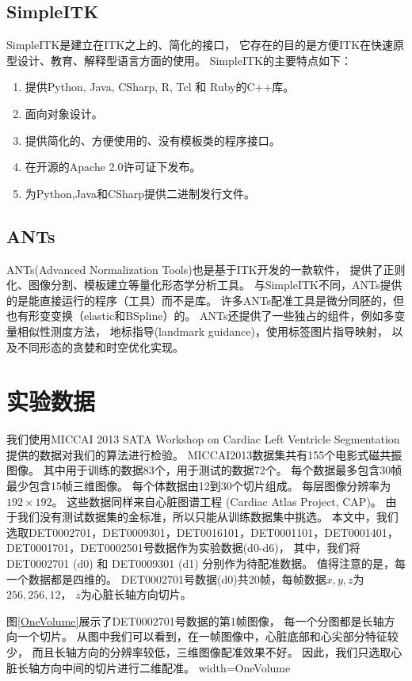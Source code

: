 \subsection{SimpleITK}
SimpleITK是建立在ITK之上的、简化的接口，
它存在的目的是方便ITK在快速原型设计、教育、解释型语言方面的使用。
SimpleITK的主要特点如下：
\begin{enumerate}
\item 提供Python, Java, CSharp, R, Tcl 和 Ruby的C++库。
\item 面向对象设计。
\item 提供简化的、方便使用的、没有模板类的程序接口。
\item 在开源的Apache 2.0许可证下发布。
\item 为Python,Java和CSharp提供二进制发行文件。
\end{enumerate}

\subsection{ANTs}
ANTs(Advanced Normalization Tools)也是基于ITK开发的一款软件，
提供了正则化、图像分割、模板建立等量化形态学分析工具。
与SimpleITK不同，ANTs提供的是能直接运行的程序（工具）而不是库。
许多ANTs配准工具是微分同胚的，但也有形变变换（elastic和BSpline）的。
ANTs还提供了一些独占的组件，例如多变量相似性测度方法，
地标指导(landmark guidance)，使用标签图片指导映射，
以及不同形态的贪婪和时空优化实现。

\section{实验数据}

我们使用MICCAI 2013 SATA Workshop on  Cardiac Left Ventricle Segmentation
提供的数据对我们的算法进行检验。
MICCAI2013数据集共有155个电影式磁共振图像。
其中用于训练的数据83个，用于测试的数据72个。
每个数据最多包含30帧最少包含15帧三维图像。
每个体数据由12到30个切片组成。
每层图像分辨率为$192\times192$。
这些数据同样来自心脏图谱工程
(Cardiac Atlas Project, CAP)。
由于我们没有测试数据集的金标准，所以只能从训练数据集中挑选。
本文中，我们选取DET0002701，DET0009301，DET0016101，DET0001101，DET0001401，
DET0001701，DET0002501号数据作为实验数据(d0-d6)，
其中，我们将 DET0002701 (d0) 和 DET0009301 (d1) 分别作为待配准数据。
值得注意的是，每一个数据都是四维的。
DET0002701号数据(d0)共20帧，每帧数据$x,y,z$为$256,256,12$，
$z$为心脏长轴方向切片。

图\ref{OneVolume}展示了DET0002701号数据的第1帧图像，
每一个分图都是长轴方向一个切片。
从图中我们可以看到，在一帧图像中，心脏底部和心尖部分特征较少，
而且长轴方向的分辨率较低，三维图像配准效果不好。
因此，我们只选取心脏长轴方向中间的切片进行二维配准。
%
{width=\textwidth}{OneVolume}

